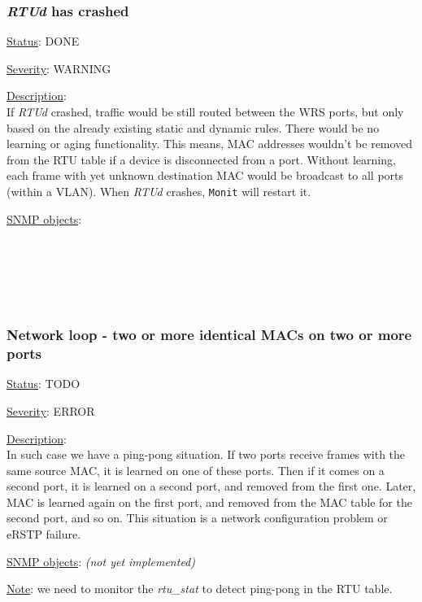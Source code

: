 \subsubsection{\bf \emph{RTUd} has crashed}
		\label{fail:data:rtu_crash}
		\begin{pck_descr}
			\item [] \underline{Status}: DONE
			\item [] \underline{Severity}: WARNING
			\item [] \underline{Description}:\\
				If \emph{RTUd} crashed, traffic would be still routed between the WRS ports, but
				only based on the already existing static and dynamic rules. There would be
				no learning or aging functionality. This means, MAC addresses wouldn't be
				removed from the RTU table if a device is disconnected from a port.
				Without learning, each frame with yet unknown destination MAC would be
				broadcast to all ports (within a VLAN). When \emph{RTUd} crashes,
				\texttt{Monit} will restart it.
			\item [] \underline{SNMP objects}:\\
				{\footnotesize
				\\
				\\
				\\
				\\
				\\
				 }
		\end{pck_descr}

\subsubsection{\bf Network loop - two or more identical MACs on two or more ports}
		\label{fail:data:net_loop}
		\begin{pck_descr}
			\item [] \underline{Status}: TODO
			\item [] \underline{Severity}: ERROR
			\item [] \underline{Description}:\\
				In such case we have a ping-pong situation. If two ports receive frames
				with the same source MAC, it is learned on one of these ports. Then if
				it comes on a second port, it is learned on a second port, and removed
				from the first one. Later, MAC is learned again on the first port, and
				removed from the MAC table for the second port, and so on. This
				situation is a network configuration problem or eRSTP failure.
			\item [] \underline{SNMP objects}: \emph{(not yet implemented)}
			\item [] \underline{Note}: we need to monitor the \emph{rtu\_stat} to
				detect ping-pong in the RTU table.
		\end{pck_descr}


